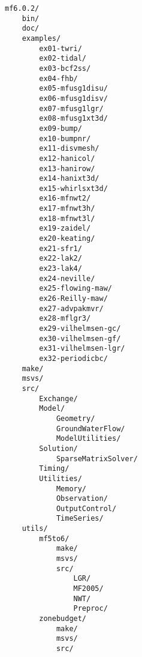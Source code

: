\begin{verbatim}
mf6.0.2/ 
    bin/ 
    doc/ 
    examples/ 
        ex01-twri/ 
        ex02-tidal/ 
        ex03-bcf2ss/ 
        ex04-fhb/ 
        ex05-mfusg1disu/ 
        ex06-mfusg1disv/ 
        ex07-mfusg1lgr/ 
        ex08-mfusg1xt3d/ 
        ex09-bump/ 
        ex10-bumpnr/ 
        ex11-disvmesh/ 
        ex12-hanicol/ 
        ex13-hanirow/ 
        ex14-hanixt3d/ 
        ex15-whirlsxt3d/ 
        ex16-mfnwt2/ 
        ex17-mfnwt3h/ 
        ex18-mfnwt3l/ 
        ex19-zaidel/ 
        ex20-keating/ 
        ex21-sfr1/ 
        ex22-lak2/ 
        ex23-lak4/ 
        ex24-neville/ 
        ex25-flowing-maw/ 
        ex26-Reilly-maw/ 
        ex27-advpakmvr/ 
        ex28-mflgr3/ 
        ex29-vilhelmsen-gc/ 
        ex30-vilhelmsen-gf/ 
        ex31-vilhelmsen-lgr/ 
        ex32-periodicbc/ 
    make/ 
    msvs/ 
    src/ 
        Exchange/ 
        Model/ 
            Geometry/ 
            GroundWaterFlow/ 
            ModelUtilities/ 
        Solution/ 
            SparseMatrixSolver/ 
        Timing/ 
        Utilities/ 
            Memory/ 
            Observation/ 
            OutputControl/ 
            TimeSeries/ 
    utils/ 
        mf5to6/ 
            make/ 
            msvs/ 
            src/ 
                LGR/ 
                MF2005/ 
                NWT/ 
                Preproc/ 
        zonebudget/ 
            make/ 
            msvs/ 
            src/ 
\end{verbatim}
